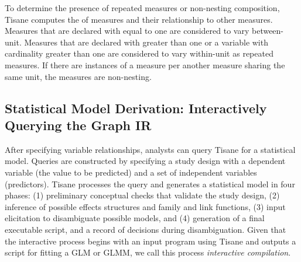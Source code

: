 To determine the presence of repeated measures or non-nesting composition,
Tisane computes the \numberofinstances of measures and their relationship to
other measures. Measures that are declared with \numberofinstances equal to one
are considered to vary between-unit. Measures that are declared with
\numberofinstances greater than one or a variable with cardinality greater than
one are considered to vary within-unit as repeated measures. If there are
instances of a measure per another measure sharing the same unit, the measures
are non-nesting.


\subsection{Statistical Model Derivation: Interactively Querying the Graph IR}
\label{sec:interaction_model} After specifying variable relationships, analysts
can query Tisane for a statistical model. Queries are constructed by specifying
a study design with a dependent variable (the value to be predicted) and a set
of independent variables (predictors). Tisane processes the query and generates
a statistical model in four phases: (1) preliminary conceptual checks that
validate the study design, (2) inference of possible effects structures and
family and link functions, (3) input elicitation to disambiguate possible
models, and (4) generation of a final executable script, and a record of decisions during disambiguation. Given that the interactive process begins with
an input program using Tisane and outputs a script for fitting a GLM or GLMM, we
call this process \textit{interactive compilation}.

